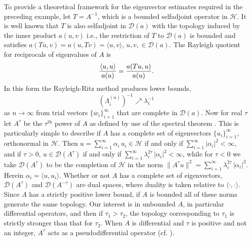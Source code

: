 \documentclass[final]{siamltex}
\numberwithin{equation}{section}
\begin{document}
To provide a theoretical framework for the eigenvector estimates required in the preceding example, let $T=A^{-1}$, which is a bounded selfadjoint operator in $\mathcal{H}$. It is well known that $T$ is also selfadjoint in $\mathcal{D}(a)$ with the topology induced by the inner product $a(u,v)$ i.e., the restriction of $T$ to $\mathcal{D}(a)$ is bounded and satisfies $a(T u, v) = a(u, T v) = \langle u, v\rangle$, $u, v, \in \mathcal{D}(a)$. The Rayleigh quotient for reciprocals of eigenvalues of $A$ is
\begin{equation}
\frac{\langle u, u\rangle}{a(u)} = \frac{a(T u, u)}{a(u)}.
\notag
\end{equation}
In this form the Rayleigh-Ritz method produces lower bounds, \[\left(\Lambda_i^{(n)}\right)^{-1} \nearrow \lambda_i^{-1}\] as $n \to \infty$ from trial vectors $\{ w_i \}_{i=1}^{\infty}$ that are complete in $\mathcal{D}(a)$. Now for real $\tau$ let $A^{\tau}$ be the $\tau^{\text{th}}$ power of $A$ as defined by use of the spectral theorem \cite{Kato}. This is particularly simple to describe if $A$ has a complete set of eigenvectors $\{ u_i \}_{i=1}^{\infty}$, orthonormal in $\mathcal{H}$. Then $u=\sum_{i=1}^{\infty} \alpha_i \, u_i \in \mathcal{H}$ if and only if $\sum_{i=1}^{\infty} |\alpha_i|^2 <\infty$, and if $\tau>0$, $u \in \mathcal{D}(A^{\tau})$ if and only if $\sum_{i=1}^{\infty} \lambda_i^{2 \tau} \, |\alpha_i|^2 <\infty$, while for $\tau<0$ we take $\mathcal{D}(A^{\tau})$ to be the completion of $\mathcal{H}$ in the norm $\|A^{\tau} u \|^2 = \sum_{i=1}^{\infty} \lambda_i^{2 \tau} \, |\alpha_i|^2$. Herein $\alpha_i =\langle u, u_i \rangle$. Whether or not $A$ has a complete set of eigenvectors, $\mathcal{D}(A^{\tau})$
and $\mathcal{D}(A^{-\tau})$ are dual spaces, where duality is taken relative to $\langle \cdot, \cdot \rangle$. Since $A$ has a strictly positive lower bound, if $A$ is bounded all of these norms generate the same topology. Our interest is in unbounded $A$, in particular differential operators, and then if $\tau_1>\tau_2$, the topology corresponding to $\tau_1$ is strictly stronger than that for $\tau_2$. When $A$ is differential and $\tau$ is positive and not an integer, $A^{\tau}$ acts as a pseudodifferential operator (cf. \cite{Taylor}).
\end{document}
